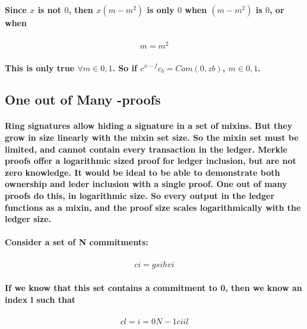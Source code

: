 \documentclass{article}
\begin{document}
\paragraph{Since $x$ is not $0$, then $x (m-m^2)$ is only $0$ when $(m-m^2)$ is $0$, or when}

\begin{eqnarray}
  m = m^2
\end{eqnarray}

\paragraph{This is only true $\forall m \in {0,1}$.  So if $c^{x-f} c_b = Com(0,zb)$, $m \in {0,1}$.}


\subsection{One out of Many -proofs}

\paragraph{Ring signatures allow hiding a signature in a set of mixins.  But they grow in size linearly with the mixin set size.  So the mixin set must be limited, and cannot contain every transaction in the ledger.  Merkle proofs offer a logarithmic sized proof for ledger inclusion, but are not zero knowledge.  It would be ideal to be able to demonstrate both ownership and leder inclusion with a single proof.  One out of many proofs do this, in logarithmic size.  So every output in the ledger functions as a mixin, and the proof size scales logarithmically with the ledger size.}

\paragraph{Consider a set of N commitments:}

\begin{eqnarray}
  ci=gsihvi
\end{eqnarray}

\paragraph{If we know that this set contains a commitment to 0, then we know an index l such that}

\begin{eqnarray}
  cl=i=0N-1ciil
\end{eqnarray}
\end{document}
